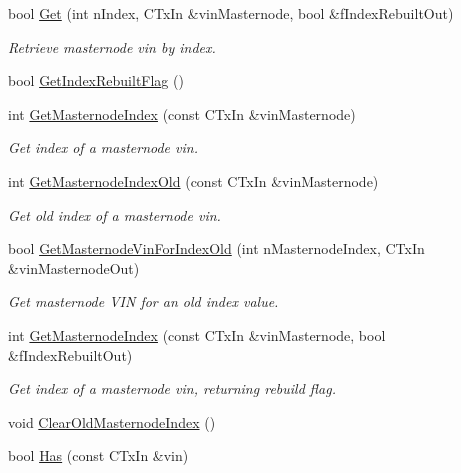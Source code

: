 \begin{DoxyCompactItemize}
\item 
bool \mbox{\hyperlink{class_c_masternode_man_a492f859f9d5ab1bde26cb258781f8f96}{Get}} (int n\+Index, C\+Tx\+In \&vin\+Masternode, bool \&f\+Index\+Rebuilt\+Out)
\begin{DoxyCompactList}\small\item\em Retrieve masternode vin by index. \end{DoxyCompactList}\item 
bool \mbox{\hyperlink{class_c_masternode_man_af0516e3a6701393d758cf01b1599e6de}{Get\+Index\+Rebuilt\+Flag}} ()
\item 
int \mbox{\hyperlink{class_c_masternode_man_a18ee0a01d9be439ca05491a6065e616f}{Get\+Masternode\+Index}} (const C\+Tx\+In \&vin\+Masternode)
\begin{DoxyCompactList}\small\item\em Get index of a masternode vin. \end{DoxyCompactList}\item 
int \mbox{\hyperlink{class_c_masternode_man_a3948fb72b3334a69329f2f91cdf46df0}{Get\+Masternode\+Index\+Old}} (const C\+Tx\+In \&vin\+Masternode)
\begin{DoxyCompactList}\small\item\em Get old index of a masternode vin. \end{DoxyCompactList}\item 
bool \mbox{\hyperlink{class_c_masternode_man_ac5bcdd6a903e8c0f59d4eb9956037f83}{Get\+Masternode\+Vin\+For\+Index\+Old}} (int n\+Masternode\+Index, C\+Tx\+In \&vin\+Masternode\+Out)
\begin{DoxyCompactList}\small\item\em Get masternode V\+IN for an old index value. \end{DoxyCompactList}\item 
int \mbox{\hyperlink{class_c_masternode_man_a5749bd87e0713bac82777e0041ca5104}{Get\+Masternode\+Index}} (const C\+Tx\+In \&vin\+Masternode, bool \&f\+Index\+Rebuilt\+Out)
\begin{DoxyCompactList}\small\item\em Get index of a masternode vin, returning rebuild flag. \end{DoxyCompactList}\item 
void \mbox{\hyperlink{class_c_masternode_man_a3d8022f0810b446e1e06b9474b724a15}{Clear\+Old\+Masternode\+Index}} ()
\item 
bool \mbox{\hyperlink{class_c_masternode_man_ae0a0e09afbf8c3935b85c1d0a141c23d}{Has}} (const C\+Tx\+In \&vin)

\end{DoxyCompactItemize}
